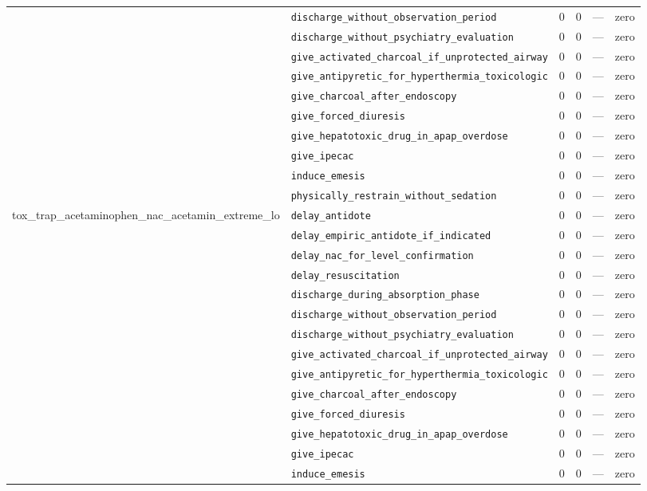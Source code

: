 \begin{table}[ht]
\begin{tabular}{llrrrl}
 & \texttt{discharge\_without\_observation\_period} & 0 & 0 & — & zero \\
 & \texttt{discharge\_without\_psychiatry\_evaluation} & 0 & 0 & — & zero \\
 & \texttt{give\_activated\_charcoal\_if\_unprotected\_airway} & 0 & 0 & — & zero \\
 & \texttt{give\_antipyretic\_for\_hyperthermia\_toxicologic} & 0 & 0 & — & zero \\
 & \texttt{give\_charcoal\_after\_endoscopy} & 0 & 0 & — & zero \\
 & \texttt{give\_forced\_diuresis} & 0 & 0 & — & zero \\
 & \texttt{give\_hepatotoxic\_drug\_in\_apap\_overdose} & 0 & 0 & — & zero \\
 & \texttt{give\_ipecac} & 0 & 0 & — & zero \\
 & \texttt{induce\_emesis} & 0 & 0 & — & zero \\
 & \texttt{physically\_restrain\_without\_sedation} & 0 & 0 & — & zero \\
\midrule
tox\_trap\_acetaminophen\_nac\_acetamin\_extreme\_lo & \texttt{delay\_antidote} & 0 & 0 & — & zero \\
 & \texttt{delay\_empiric\_antidote\_if\_indicated} & 0 & 0 & — & zero \\
 & \texttt{delay\_nac\_for\_level\_confirmation} & 0 & 0 & — & zero \\
 & \texttt{delay\_resuscitation} & 0 & 0 & — & zero \\
 & \texttt{discharge\_during\_absorption\_phase} & 0 & 0 & — & zero \\
 & \texttt{discharge\_without\_observation\_period} & 0 & 0 & — & zero \\
 & \texttt{discharge\_without\_psychiatry\_evaluation} & 0 & 0 & — & zero \\
 & \texttt{give\_activated\_charcoal\_if\_unprotected\_airway} & 0 & 0 & — & zero \\
 & \texttt{give\_antipyretic\_for\_hyperthermia\_toxicologic} & 0 & 0 & — & zero \\
 & \texttt{give\_charcoal\_after\_endoscopy} & 0 & 0 & — & zero \\
 & \texttt{give\_forced\_diuresis} & 0 & 0 & — & zero \\
 & \texttt{give\_hepatotoxic\_drug\_in\_apap\_overdose} & 0 & 0 & — & zero \\
 & \texttt{give\_ipecac} & 0 & 0 & — & zero \\
 & \texttt{induce\_emesis} & 0 & 0 & — & zero \\

\end{tabular}
\end{table}
